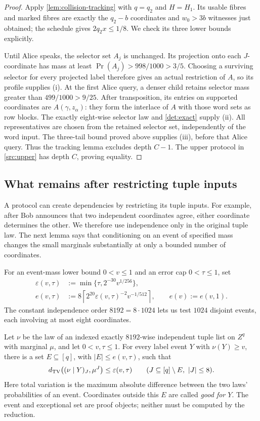 \documentclass[11pt]{article} \usepackage[utf8]{inputenc}
\theoremstyle{plain} \newtheorem{theorem}{Theorem}[section]
\theoremstyle{definition} \newaliascnt{definition}{theorem}
\newcommand{\ceil}[1]{\left\lceil#1\right\rceil}
\begin{document}
\begin{proof}
Apply \cref{lem:collision-tracking} with $q=q_2$ and $H=H_1$.
Its usable fibres and marked fibres are exactly the $q_2-b$ coordinates and
$w_0>3b$ witnesses just obtained; the schedule gives $2q_2x\le1/8$.
We check its three lower bounds explicitly.

Until Alice speaks, the selector set $A_j$ is unchanged. Its projection onto
each $J$-coordinate has mass at least $\Pr(A_j)>998/1000>3/5$.
Choosing a surviving selector for every projected label therefore gives
an actual restriction of $A$, so its profile supplies (i).
At the first Alice query, a denser child retains selector mass greater than
$499/1000>9/25$. After transposition, its entries on supported coordinates
are $A(\gamma,z_\alpha)$: they form the interlace of $A$ with those word
sets as row blocks. The exactly eight-wise selector law and \cref{det:exact} supply (ii).
All representatives are chosen from the retained selector set, independently
of the word input. The three-tail bound proved above supplies (iii), before
that Alice query. Thus the tracking lemma excludes depth $C-1$.
The upper protocol in \cref{src:upper} has depth $C$, proving equality.
\end{proof}

\subsection{What remains after restricting tuple inputs}
\label{sec:retained-tuples}

A protocol can create dependencies by restricting its tuple inputs. For
example, after Bob announces that two independent coordinates agree, either
coordinate determines the other. We therefore use independence only in the
original tuple law. The next lemma says that conditioning on an event of
specified mass changes the small marginals substantially at only a bounded
number of coordinates.

For an event-mass lower bound $0<v\le1$ and an error cap $0<\tau\le1$, set
\[
\begin{aligned}
\varepsilon(v,\tau)&:=\min\{\tau,2^{-30}v^{1/256}\},\\
e(v,\tau)&:=8\ceil{2^{20}\varepsilon(v,\tau)^{-2}v^{-1/512}},
\qquad e(v):=e(v,1).
\end{aligned}
\]
The constant independence order $8192=8\cdot1024$ lets us test $1024$
disjoint events, each involving at most eight coordinates.

\begin{lemma}\label{det:conditioning}
Let $\nu$ be the law of an indexed exactly $8192$-wise independent tuple list
on $Z^q$ with marginal $\mu$, and let $0<v,\tau\le1$. For every label event
$Y$ with $\nu(Y)\ge v$, there is a set $E\subseteq[q]$, with
$|E|\le e(v,\tau)$, such that
\[
d_{\rm TV}\bigl((\nu\mid Y)_J,\mu^J\bigr)\le\varepsilon(v,\tau)
\qquad
(J\subseteq[q]\setminus E,\ |J|\le8).
\]
Here total variation is the maximum absolute difference between the two
laws' probabilities of an event. Coordinates outside this $E$ are called
\emph{good for $Y$}. The event and exceptional set are proof objects;
neither must be computed by the reduction.
\end{lemma}
\end{document}
